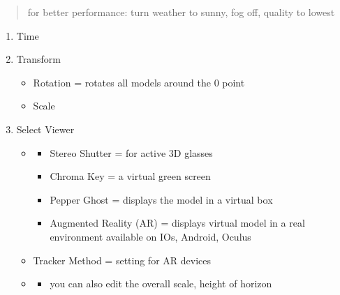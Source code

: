\documentclass[letterpaper,10pt,english]{sphinxmanual}
\begin{document}
\begin{quote}

\sphinxAtStartPar
{} for better performance: turn weather to sunny, fog off, quality to lowest
\end{quote}
\begin{enumerate}
%
\setcounter{enumi}{14}
\item {} 
\sphinxAtStartPar
Time

\item {} 
\sphinxAtStartPar
Transform
\begin{itemize}
\item {} 
\sphinxAtStartPar
Rotation = rotates all models around the 0 point

\item {} 
\sphinxAtStartPar
Scale

\end{itemize}

\item {} 
\sphinxAtStartPar
Select Viewer
\begin{itemize}
\item {} \begin{description}
\begin{itemize}
\item {} 
\sphinxAtStartPar
Stereo Shutter = for active 3D glasses

\item {} 
\sphinxAtStartPar
Chroma Key = a virtual green screen

\item {} 
\sphinxAtStartPar
Pepper Ghost = displays the model in a virtual box

\item {} 
\sphinxAtStartPar
Augmented Reality (AR) = displays virtual model in a real environment \sphinxhyphen{} available on IOs, Android, Oculus

\end{itemize}

\end{description}

\item {} 
\sphinxAtStartPar
Tracker Method = setting for AR devices

\item {} \begin{description}
\begin{itemize}
\item {} 
\sphinxAtStartPar
you can also edit the overall scale, height of horizon


\end{itemize}
\end{description}
\end{itemize}
\end{enumerate}
\end{document}
